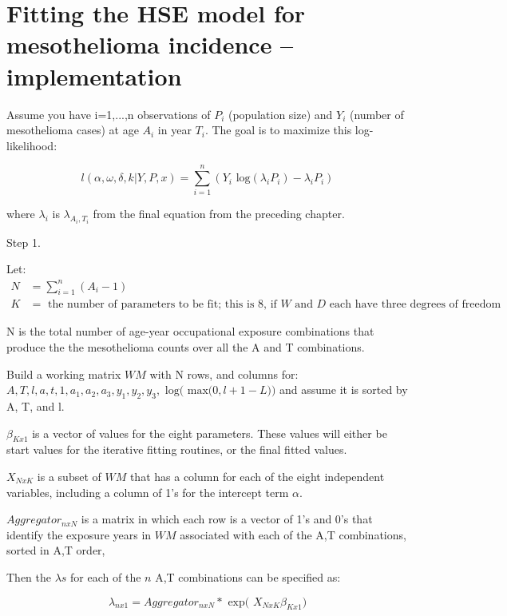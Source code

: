 \documentclass[paper=letter,listof=leveldown,appendixprefix=true]{scrreprt}\usepackage{graphicx, color}
\begin{document}
\chapter{Fitting the HSE model for mesothelioma incidence -- implementation}

Assume you have i=1,...,n observations of $P_i$ (population size) and $Y_i$ (number of mesothelioma cases) at age $A_i$ in year $T_i$.  The goal is to maximize this log-likelihood:


\begin{equation*}
l(\alpha, \omega, \delta, k|Y,P,x) = \sum\limits_{i=1}^n (Y_i \text{ log}(\lambda_i P_i) - \lambda_i P_i)
\end{equation*} 

where $\lambda_i$  is  $\lambda_{A_i,T_i}$ from the final equation from the preceding chapter.

Step 1.

Let:
\begin{align*}
N & = \sum_{i=1}^n (A_i - 1) \\
K & = \text{ the number of parameters to be fit; this is 8, if $W$ and $D$ each have three degrees of freedom }
\end{align*}

N is the total number of age-year occupational exposure combinations that produce the the mesothelioma counts over all the A and T combinations. 

Build a working matrix $WM$ with N rows, and columns for:
  $A, T, l, a, t, 1, a_1, a_2, a_3, y_1, y_2, y_3, \text{ log( max(} 0, l + 1 - L))$
  and assume it is sorted by A, T, and l.
  
$\beta_{Kx1}$ is a vector of values for the eight parameters.  These values will either be start values for the iterative fitting routines, or the final fitted values.

$X_{NxK}$ is a subset of $WM$ that has a column for each of the eight independent variables, including a column of 1's for the intercept term $\alpha$.

$Aggregator_{nxN}$ is a matrix in which each row is a vector of 1's and 0's that identify the exposure years in $WM$  associated with each of the A,T combinations, sorted in A,T order,

Then the $\lambda s$ for each of the $n$ A,T combinations can be specified as:

\begin{equation*}
\lambda_{nx1} = Aggregator_{nxN} * \text{ exp( } X_{NxK} \beta_{Kx1}) 
\end{equation*}
\end{document}
